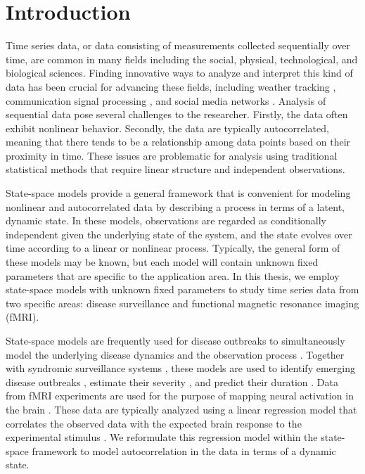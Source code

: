 \chapter{Introduction}

Time series data, or data consisting of measurements collected sequentially over time, are common in many fields including the social, physical, technological, and biological sciences. Finding innovative ways to analyze and interpret this kind of data has been crucial for advancing these fields, including weather tracking \citep{dixon:wiener:weather:1993}, communication signal processing \citep{gardner:signal:1994}, and social media networks \citep{smith:social:2009}. Analysis of sequential data pose several challenges to the researcher. Firstly, the data often exhibit nonlinear behavior. Secondly, the data are typically autocorrelated, meaning that there tends to be a relationship among data points based on their proximity in time. These issues are problematic for analysis using traditional statistical methods that require linear structure and independent observations.

State-space models provide a general framework that is convenient for modeling nonlinear and autocorrelated data by describing a process in terms of a latent, dynamic state. In these models, observations are regarded as conditionally independent given the underlying state of the system, and the state evolves over time according to a linear or nonlinear process. Typically, the general form of these models may be known, but each model will contain unknown fixed parameters that are specific to the application area. In this thesis, we employ state-space models with unknown fixed parameters to study time series data from two specific areas: disease surveillance and functional magnetic resonance imaging (fMRI).

State-space models are frequently used for disease outbreaks to simultaneously model the underlying disease dynamics and the observation process \citep{Mart:Cone:Lope:Lope:baye:2008, merl2009statistical, ludkovski2010optimal, skvortsov2012monitoring, unkel2012statistical, sheinson:niemi:meiring:epidtrack:2014}. Together with syndromic surveillance systems \citep{henning2004overview, wagner2006biosurveillance, wilson2006synsurveillance, hakenewerth2009north, Gins:Mohe:Pate:Bram:Smol:Bril:dete:2009}, these models are used to identify emerging disease outbreaks \citep{neill2006bayesian}, estimate their severity \citep{merl2009statistical}, and predict their duration \cite{ludkovski2010optimal}. Data from fMRI experiments are used for the purpose of mapping neural activation in the brain \citep{ashby:fmri:2011,kiebel:holmes:spm:2007,pold:fmri:2011}. These data are typically analyzed using a linear regression model that correlates the observed data with the expected brain response to the experimental stimulus \citep{friston:frith:JCBFM:1991,friston:holmes:hbm:1995}. We reformulate this regression model within the state-space framework to model autocorrelation in the data in terms of a dynamic state.

